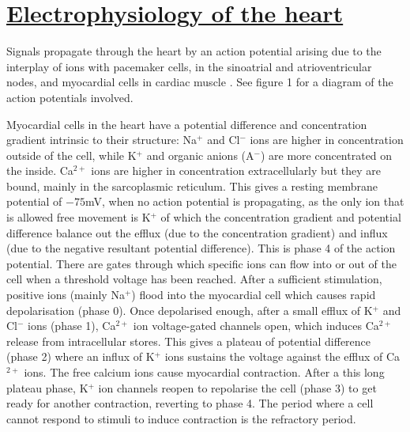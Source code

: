 \documentclass[twocolumn, a1paper]{article}
\begin{document}
\section{\textbf{\underline{Electrophysiology of the heart}}}

Signals propagate through the heart by an action potential arising due to the interplay of ions with pacemaker cells, in the sinoatrial and atrioventricular nodes, and myocardial cells in cardiac muscle \cite{Augustus}. See figure 1 for a diagram of the action potentials involved.

 Myocardial cells in the heart have a potential difference and concentration gradient intrinsic to their structure: Na$^{+}$ and Cl$^{-}$ ions are higher in concentration outside of the cell, while K$^{+}$ and organic anions (A$^{-}$) are more concentrated on the inside. Ca$^{2+}$  ions are higher in concentration extracellularly but they are bound, mainly in the sarcoplasmic reticulum. 
This gives a resting membrane potential of $-75$mV, when no action potential is propagating, as the only ion that is allowed free movement is K$^{+}$ of which the concentration gradient and potential difference balance out the efflux (due to the concentration gradient) and influx (due to the negative resultant potential difference). This is phase 4 of the action potential. There are gates through which specific ions can flow into or out of the cell when a threshold voltage has been reached. After a sufficient stimulation, positive ions (mainly Na$^{+}$)  flood into the myocardial cell which causes rapid depolarisation (phase 0). Once depolarised enough, after a small efflux of K$^{+}$ and  Cl$^{-}$ ions (phase 1), Ca$^{2+}$ ion voltage-gated channels open, which induces Ca$^{2+}$ release from intracellular stores. This gives a plateau of potential difference (phase 2) where an influx of  K$^{+}$ ions sustains the voltage against the efflux of  Ca$^{2+}$ ions. The free calcium ions cause myocardial contraction. After a this long plateau phase,  K$^{+}$ ion channels reopen to repolarise the cell (phase 3) to get ready for another contraction, reverting to phase 4. The period where a cell cannot respond to stimuli to induce contraction is the refractory period. 



\end{document}
